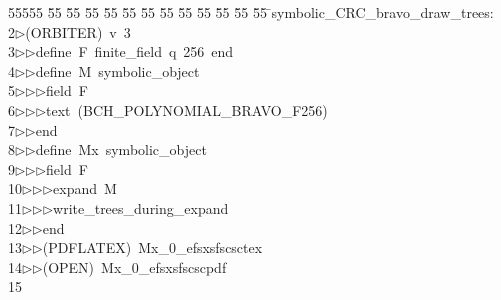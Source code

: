 %
%
\begin{tabbing}
55555 \= 55 \= 55 \= 55 \= 55 \= 55 \= 55 \= 55 \= 55 \= 55 \= 55 \= 55 \= 55 \= \>symbolic\_CRC\_bravo\_draw\_trees:\\[0pt]
2\>$\triangleright$\>(ORBITER)\ v\ 3\ \\[0pt]
3\>$\triangleright$\>$\triangleright$\>define\ F\ finite\_field\ q\ 256\ end\ \\[0pt]
4\>$\triangleright$\>$\triangleright$\>define\ M\ symbolic\_object\ \\[0pt]
5\>$\triangleright$\>$\triangleright$\>$\triangleright$\>field\ F\ \\[0pt]
6\>$\triangleright$\>$\triangleright$\>$\triangleright$\>text\ (BCH\_POLYNOMIAL\_BRAVO\_F256)\ \\[0pt]
7\>$\triangleright$\>$\triangleright$\>end\ \\[0pt]
8\>$\triangleright$\>$\triangleright$\>define\ Mx\ symbolic\_object\ \\[0pt]
9\>$\triangleright$\>$\triangleright$\>$\triangleright$\>field\ F\ \\[0pt]
10\>$\triangleright$\>$\triangleright$\>$\triangleright$\>expand\ M\ \\[0pt]
11\>$\triangleright$\>$\triangleright$\>$\triangleright$\>write\_trees\_during\_expand\ \\[0pt]
12\>$\triangleright$\>$\triangleright$\>end\\[0pt]
13\>$\triangleright$\>$\triangleright$\>(PDFLATEX)\ Mx\_0\_efsxsfscsctex\\[0pt]
14\>$\triangleright$\>$\triangleright$\>(OPEN)\ Mx\_0\_efsxsfscscpdf\\[0pt]
15\>\end{tabbing}

